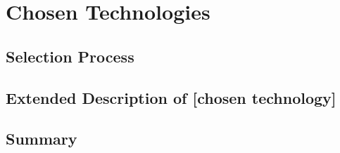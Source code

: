 \documentclass[../Main.tex]{subfiles}
\begin{document}
\section{Chosen Technologies}
\subsection{Selection Process}
\subsection{Extended Description of [chosen technology]}
\subsection{Summary}

\biblio %
\end{document}
